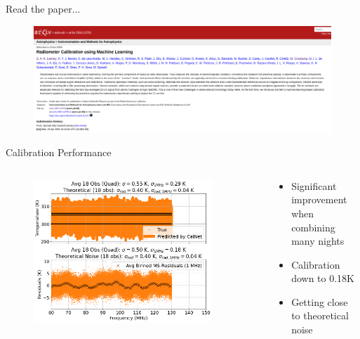 \documentclass[aspectratio=169]{beamer}
\begin{document}
\begin{frame}{\small{Read the paper...}}
	\begin{figure}
		\centering
		\includegraphics[width=\textwidth]{images/paper_front.png}
	\end{figure}
\end{frame}

\begin{frame}{\small{Calibration Performance}}
	\begin{columns}[c]
		\begin{column}{0.6\textwidth}
			\begin{figure}
				\centering
				\includegraphics[width=0.9\textwidth]{images/pasted_image_20250515095127.png}
			\end{figure}
		\end{column}
		\begin{column}{0.4\textwidth}
			\begin{itemize}
				\item Significant improvement when combining many nights
				\item Calibration down to 0.18K
				\item Getting close to theoretical noise
			\end{itemize}
		\end{column}
	\end{columns}
\end{frame}
\end{document}
